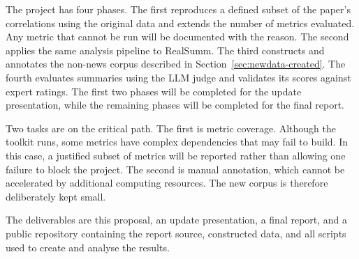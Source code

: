 \documentclass[11pt]{article}
\begin{document}
The project has four phases. The first reproduces a defined subset of the paper's correlations using the original data and extends the number of metrics evaluated. Any metric that cannot be run will be documented with the reason. The second applies the same analysis pipeline to RealSumm. The third constructs and annotates the non-news corpus described in Section~\ref{sec:newdata-created}. The fourth evaluates summaries using the LLM judge and validates its scores against expert ratings. The first two phases will be completed for the update presentation, while the remaining phases will be completed for the final report.

Two tasks are on the critical path. The first is metric coverage. Although the toolkit runs, some metrics have complex dependencies that may fail to build. In this case, a justified subset of metrics will be reported rather than allowing one failure to block the project. The second is manual annotation, which cannot be accelerated by additional computing resources. The new corpus is therefore deliberately kept small.

The deliverables are this proposal, an update presentation, a final report, and a public repository containing the report source, constructed data, and all scripts used to create and analyse the results.


\end{document}
